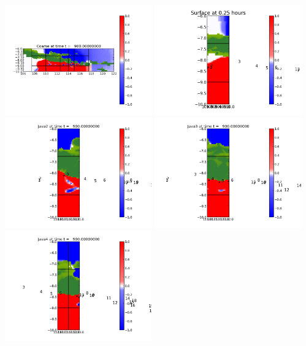 \documentclass[11pt]{article}
\begin{document}
\vskip 10pt 
\includegraphics[width=0.475\textwidth]{frame0001fig0.png}
\includegraphics[width=0.475\textwidth]{frame0001fig15.png}
\vskip 10pt 
\includegraphics[width=0.475\textwidth]{frame0001fig25.png}
\includegraphics[width=0.475\textwidth]{frame0001fig20.png}
\vskip 10pt 
\includegraphics[width=0.475\textwidth]{frame0001fig30.png}
\end{document}
